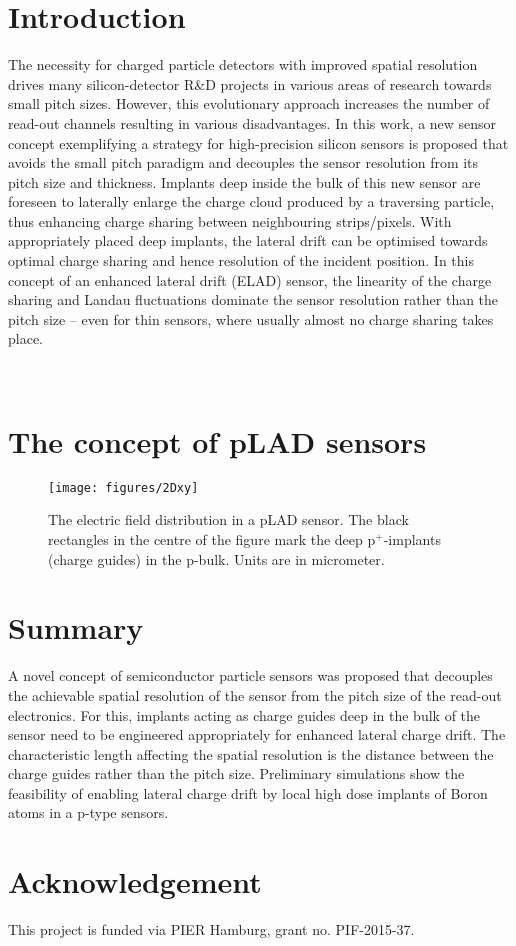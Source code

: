 \documentclass[preprint]{elsarticle}
\begin{document}
\section{Introduction}
The necessity for charged particle detectors with improved spatial resolution drives many silicon-detector R\&D projects in various areas of research towards small pitch sizes.
However, this evolutionary approach increases the number of read-out channels resulting in various disadvantages. 
In this work, a new sensor concept exemplifying a strategy for high-precision silicon sensors is proposed that avoids the small pitch paradigm and decouples the sensor resolution from its pitch size and thickness.
Implants deep inside the bulk of this new sensor are foreseen to laterally enlarge the charge cloud produced by a traversing particle, thus enhancing charge sharing between neighbouring strips/pixels. 
With appropriately placed deep implants, the lateral drift can be optimised towards optimal charge sharing and hence resolution of the incident position. 
In this concept of an enhanced lateral drift (ELAD) sensor, the linearity of the charge sharing and Landau fluctuations dominate the sensor resolution rather than the pitch size
 – even for thin sensors, where usually almost no charge sharing takes place.

 ~\cite{Moliere:1948zz,PhysRev.89.1256}

\section{The concept of pLAD sensors}


\begin{figure}[t]
  \centering
  \texttt{[image: figures/2Dxy]} %
  \caption{The electric field distribution in a pLAD sensor.
  The black rectangles in the centre of the figure mark the deep p$^+$-implants (charge guides) in the p-bulk.
  Units are in micrometer.}
\label{fig:potential}
\end{figure}

\section{Summary}
A novel concept of semiconductor particle sensors was proposed that decouples the achievable spatial resolution of the sensor from the pitch size of the read-out electronics. 
For this, implants acting as charge guides deep in the bulk of the sensor need to be engineered appropriately for enhanced lateral charge drift. 
The characteristic length affecting the spatial resolution is the distance between the charge guides rather than the pitch size. 
Preliminary simulations show the feasibility of enabling lateral charge drift by local high dose implants of Boron atoms in a p-type sensors. 

\section*{Acknowledgement}
This project is funded via PIER Hamburg, grant no. PIF-2015-37.




\end{document}
